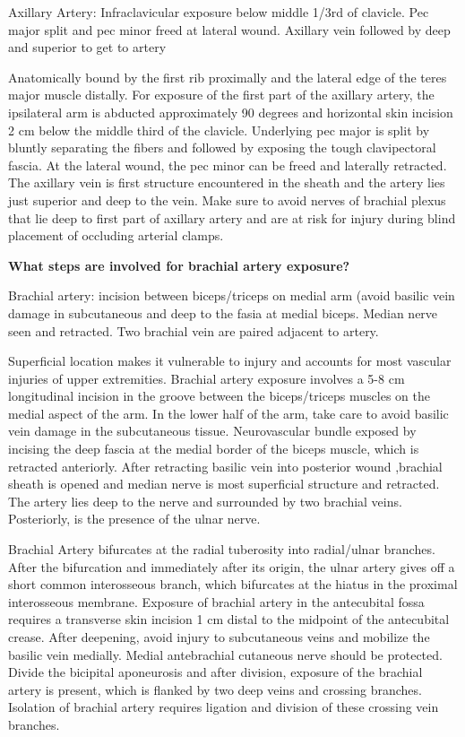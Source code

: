 \documentclass[
]{book}
\begin{document}
Axillary Artery: Infraclavicular exposure below middle 1/3rd of
clavicle. Pec major split and pec minor freed at lateral wound. Axillary
vein followed by deep and superior to get to artery

Anatomically bound by the first rib proximally and the lateral edge of
the teres major muscle distally. For exposure of the first part of the
axillary artery, the ipsilateral arm is abducted approximately 90
degrees and horizontal skin incision 2 cm below the middle third of the
clavicle. Underlying pec major is split by bluntly separating the fibers
and followed by exposing the tough clavipectoral fascia. At the lateral
wound, the pec minor can be freed and laterally retracted. The axillary
vein is first structure encountered in the sheath and the artery lies
just superior and deep to the vein. Make sure to avoid nerves of
brachial plexus that lie deep to first part of axillary artery and are
at risk for injury during blind placement of occluding arterial clamps.
\citep{garygwindAnatomicExposuresVascular2013}

\textbf{What steps are involved for brachial artery exposure?}

Brachial artery: incision between biceps/triceps on medial arm (avoid
basilic vein damage in subcutaneous and deep to the fasia at medial
biceps. Median nerve seen and retracted. Two brachial vein are paired
adjacent to artery.

Superficial location makes it vulnerable to injury and accounts for most
vascular injuries of upper extremities. Brachial artery exposure
involves a 5-8 cm longitudinal incision in the groove between the
biceps/triceps muscles on the medial aspect of the arm. In the lower
half of the arm, take care to avoid basilic vein damage in the
subcutaneous tissue. Neurovascular bundle exposed by incising the deep
fascia at the medial border of the biceps muscle, which is retracted
anteriorly. After retracting basilic vein into posterior wound ,brachial
sheath is opened and median nerve is most superficial structure and
retracted. The artery lies deep to the nerve and surrounded by two
brachial veins. Posteriorly, is the presence of the ulnar nerve.

Brachial Artery bifurcates at the radial tuberosity into radial/ulnar
branches. After the bifurcation and immediately after its origin, the
ulnar artery gives off a short common interosseous branch, which
bifurcates at the hiatus in the proximal interosseous membrane. Exposure
of brachial artery in the antecubital fossa requires a transverse skin
incision 1 cm distal to the midpoint of the antecubital crease. After
deepening, avoid injury to subcutaneous veins and mobilize the basilic
vein medially. Medial antebrachial cutaneous nerve should be protected.
Divide the bicipital aponeurosis and after division, exposure of the
brachial artery is present, which is flanked by two deep veins and
crossing branches. Isolation of brachial artery requires ligation and
division of these crossing vein branches.
\end{document}

